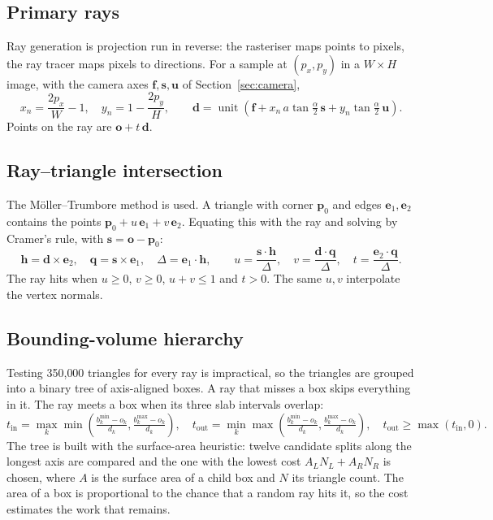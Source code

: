\documentclass[11pt,a4paper]{article}
\newcommand{\vect}[1]{\mathbf{#1}}
\newcommand{\unit}[1]{\operatorname{unit}\!\left(#1\right)}
\begin{document}
\subsection{Primary rays}
Ray generation is projection run in reverse: the rasteriser maps points to
pixels, the ray tracer maps pixels to directions. For a sample at
$(p_x,p_y)$ in a $W\times H$ image, with the camera axes
$\vect f,\vect s,\vect u$ of Section~\ref{sec:camera},
\begin{equation}
x_n=\frac{2p_x}{W}-1,\quad y_n=1-\frac{2p_y}{H},\qquad
\vect d=\unit{\vect f+x_n\,a\tan\tfrac{\alpha}{2}\,\vect s+y_n\tan\tfrac{\alpha}{2}\,\vect u}.
\end{equation}
Points on the ray are $\vect o+t\,\vect d$.

\subsection{Ray--triangle intersection}
The M\"oller--Trumbore method is used. A triangle with corner $\vect p_0$
and edges $\vect e_1,\vect e_2$ contains the points
$\vect p_0+u\,\vect e_1+v\,\vect e_2$. Equating this with the ray and
solving by Cramer's rule, with $\vect s=\vect o-\vect p_0$:
\begin{equation}
\vect h=\vect d\times\vect e_2,\quad\vect q=\vect s\times\vect e_1,\quad
\Delta=\vect e_1\cdot\vect h,\qquad
u=\frac{\vect s\cdot\vect h}{\Delta},\quad
v=\frac{\vect d\cdot\vect q}{\Delta},\quad
t=\frac{\vect e_2\cdot\vect q}{\Delta}.
\end{equation}
The ray hits when $u\ge0$, $v\ge0$, $u+v\le1$ and $t>0$. The same $u,v$
interpolate the vertex normals.

\subsection{Bounding-volume hierarchy}
Testing 350{,}000 triangles for every ray is impractical, so the triangles
are grouped into a binary tree of axis-aligned boxes. A ray that misses a
box skips everything in it. The ray meets a box when its three slab
intervals overlap:
\begin{equation}
t_{\mathrm{in}}=\max_k\min\!\left(\tfrac{b^{\min}_k-o_k}{d_k},\tfrac{b^{\max}_k-o_k}{d_k}\right),\quad
t_{\mathrm{out}}=\min_k\max\!\left(\tfrac{b^{\min}_k-o_k}{d_k},\tfrac{b^{\max}_k-o_k}{d_k}\right),\quad
t_{\mathrm{out}}\ge\max(t_{\mathrm{in}},0).
\end{equation}
The tree is built with the surface-area heuristic: twelve candidate splits
along the longest axis are compared and the one with the lowest cost
$A_LN_L+A_RN_R$ is chosen, where $A$ is the surface area of a child box and
$N$ its triangle count. The area of a box is proportional to the chance
that a random ray hits it, so the cost estimates the work that remains.
\end{document}

